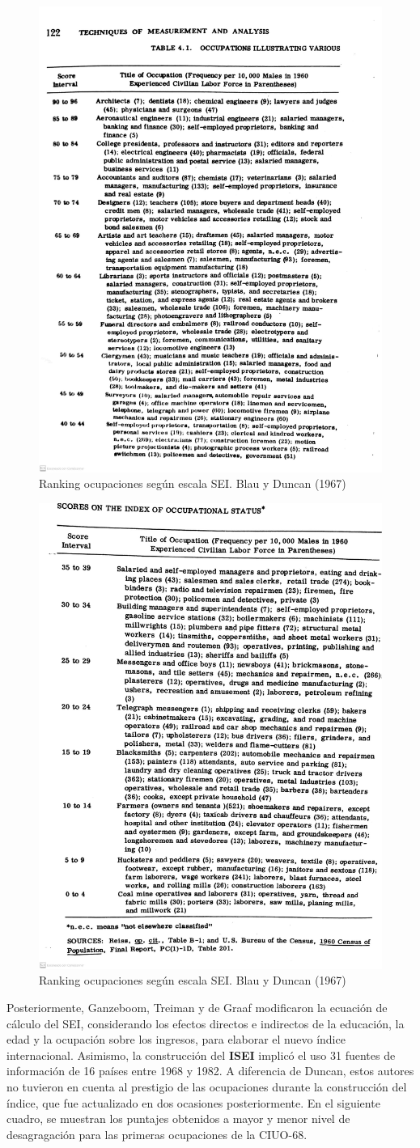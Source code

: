 \documentclass[
]{book}
\begin{document}
\begin{figure}

{\centering \includegraphics[width=0.5\linewidth]{imagenes/duncan1_1} 

}

\caption{Ranking ocupaciones según escala SEI. Blau y Duncan (1967)}\label{fig:unnamed-chunk-63-1}
\end{figure}
\begin{figure}

{\centering \includegraphics[width=0.5\linewidth]{imagenes/duncan1_2} 

}

\caption{Ranking ocupaciones según escala SEI. Blau y Duncan (1967)}\label{fig:unnamed-chunk-63-2}
\end{figure}

Posteriormente, Ganzeboom, Treiman y de Graaf modificaron la ecuación de cálculo del SEI, considerando los efectos directos e indirectos de la educación, la edad y la ocupación sobre los ingresos, para elaborar el nuevo índice internacional. Asimismo, la construcción del \textbf{ISEI} implicó el uso 31 fuentes de información de 16 países entre 1968 y 1982. A diferencia de Duncan, estos autores no tuvieron en cuenta al prestigio de las ocupaciones durante la construcción del índice, que fue actualizado en dos ocasiones posteriormente. En el siguiente cuadro, se muestran los puntajes obtenidos a mayor y menor nivel de desagragación para las primeras ocupaciones de la CIUO-68.
\end{document}
